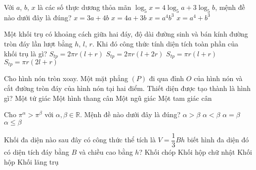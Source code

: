\begin{ex}%
Với $a$, $b$, $x$  là các số thực dương thỏa mãn $\log_5 x = 4\log_5 a + 3 \log_5 b$, mệnh đề nào dưới đây là đúng?
	\choice
	{$x=3a+4b$}
	{$x=4a+3b$}
		{\True $x=a^4 b^3$}
	{$x=a^4 + b^3$}
\end{ex}
\begin{ex}%
Một khối trụ có khoảng cách giữa hai đáy, độ dài đường sinh và bán kính đường tròn đáy lần lượt bằng  $h$, $l$, $r$. Khi đó công thức tính diện tích toàn phần của khối trụ là gì?
	\choice
	{\True  $S_{tp}=2\pi r(l+r)$}
	{$S_{tp}=2\pi r(l+2r)$}
	{$S_{tp}=\pi r(l+r)$}
	{$S_{tp}=\pi r(2l+r)$}
\end{ex}
\begin{ex}%
Cho hình nón tròn xoay. Một mặt phẳng  $(P)$ đi qua đỉnh $O$  của hình nón và cắt đường tròn đáy của hình nón tại hai điểm. Thiết diện được tạo thành là hình gì?
	\choice
	{Một tứ giác}
	{Một hình thang cân}
	{Một ngũ giác}
		{\True Một tam giác cân}
\end{ex}
\begin{ex}%
Cho $\pi^\alpha > \pi^\beta$  với $\alpha, \beta \in \mathbb{R}$. Mệnh đề nào dưới đây là đúng?
	\choice
	{\True  $\alpha >\beta$}
	{$\alpha <\beta$}
	{$\alpha =\beta$}
	{$\alpha \le \beta$}
\end{ex}
\begin{ex}%
Khối đa diện nào sau đây có công thức thể tích là  $V=\dfrac{1}{3}Bh$ biết hình đa diện đó có diện tích đáy bằng $B$  và chiều cao bằng  $h$?
	\choice
	{\True Khối chóp}
	{Khối hộp chữ nhật}
	{Khối hộp}
	{Khối lăng trụ}
\end{ex}

